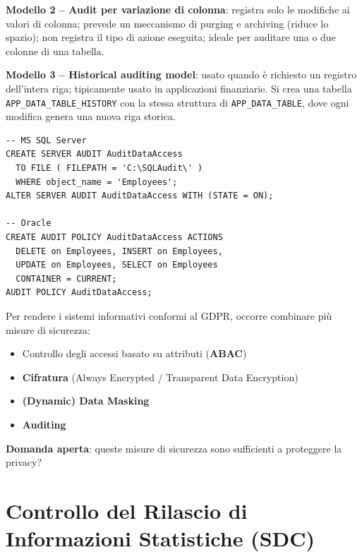 \documentclass[a4paper,11pt]{article}
\begin{document}
\begin{definizione}[Auditing]
\textbf{Modello 2 -- Audit per variazione di colonna}: registra solo le modifiche ai valori di colonna; prevede un meccanismo di purging e archiving (riduce lo spazio); non registra il tipo di azione eseguita; ideale per auditare una o due colonne di una tabella.

\textbf{Modello 3 -- Historical auditing model}: usato quando \`{e} richiesto un registro dell'intera riga; tipicamente usato in applicazioni finanziarie. Si crea una tabella \texttt{APP\_DATA\_TABLE\_HISTORY} con la stessa struttura di \texttt{APP\_DATA\_TABLE}, dove ogni modifica genera una nuova riga storica.

\begin{esempio}
\begin{verbatim}
-- MS SQL Server
CREATE SERVER AUDIT AuditDataAccess
  TO FILE ( FILEPATH = 'C:\SQLAudit\' )
  WHERE object_name = 'Employees';
ALTER SERVER AUDIT AuditDataAccess WITH (STATE = ON);

-- Oracle
CREATE AUDIT POLICY AuditDataAccess ACTIONS
  DELETE on Employees, INSERT on Employees,
  UPDATE on Employees, SELECT on Employees
  CONTAINER = CURRENT;
AUDIT POLICY AuditDataAccess;
\end{verbatim}
\end{esempio}
\end{definizione}

\begin{nota}
Per rendere i sistemi informativi conformi al GDPR, occorre combinare pi\`{u} misure di sicurezza:
\begin{itemize}
  \item Controllo degli accessi basato su attributi (\textbf{ABAC})
  \item \textbf{Cifratura} (Always Encrypted / Transparent Data Encryption)
  \item \textbf{(Dynamic) Data Masking}
  \item \textbf{Auditing}
\end{itemize}
\textbf{Domanda aperta}: queste misure di sicurezza sono sufficienti a proteggere la privacy?
\end{nota}

\section{Controllo del Rilascio di Informazioni Statistiche (SDC)}
\end{document}
